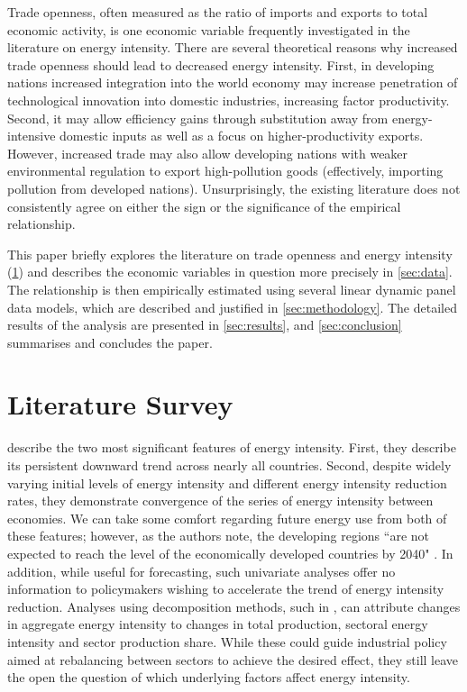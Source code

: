 \documentclass[12pt,a4paper]{article}
\begin{document}
Trade openness, often measured as the ratio of imports and exports to total economic activity, is one  economic variable frequently investigated in the literature on energy intensity.
There are several theoretical reasons why increased trade openness should lead to decreased energy intensity.
First, in developing nations increased integration into the world economy may increase penetration of technological innovation into domestic industries, increasing factor productivity.
Second, it may allow efficiency gains through substitution away from energy-intensive domestic
inputs as well as a focus on higher-productivity exports. 
However, increased trade may also allow developing nations with weaker environmental regulation to export high-pollution goods (effectively, importing pollution from developed nations). 
Unsurprisingly, the existing literature does not consistently agree on either the sign or the significance of the empirical relationship.

This paper briefly explores the literature on trade openness and energy intensity (\cref{sec:literature}) and describes the economic variables in question more precisely in \cref{sec:data}.
The relationship is then empirically estimated using several linear dynamic panel data models, which are described and justified in \cref{sec:methodology}.
The detailed results of the analysis are presented in \cref{sec:results}, and \cref{sec:conclusion} summarises and concludes the paper.

\section{Literature Survey}\label{sec:literature}

\cite{ederAnalysisEnergyIntensity2018} describe the two most significant features of energy intensity. First, they describe its persistent downward trend across nearly all countries.
Second, despite widely varying initial levels of energy intensity and different energy intensity reduction rates, they demonstrate convergence of the series of energy intensity between economies.
We can take some comfort regarding future energy use from both of these features; however, as the authors note, the developing regions ``are not expected to reach the level of the economically developed countries by 2040" \citep[p.1971]{ederAnalysisEnergyIntensity2018}.
In addition, while useful for forecasting, such univariate analyses offer no information to policymakers wishing to accelerate the trend of energy intensity reduction. 
Analyses using decomposition methods, such in \cite{liuEightMethodsDecomposing2003}, can attribute changes in aggregate energy intensity to changes in total production, sectoral energy intensity and sector production share. While these could guide industrial policy aimed at rebalancing between sectors to achieve the desired effect, they still leave the open the question of which underlying factors affect energy intensity.
\end{document}
